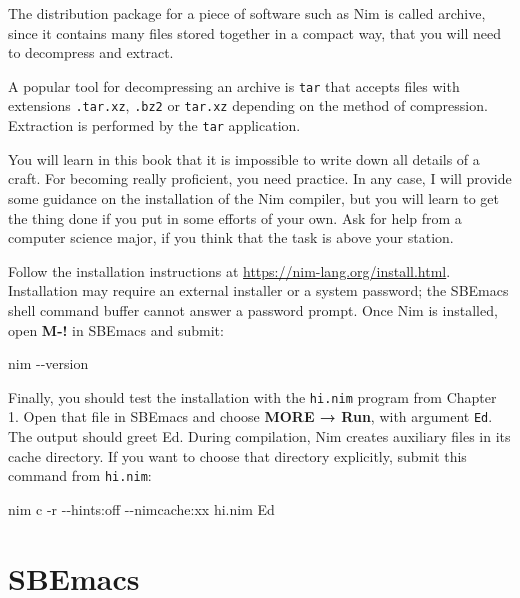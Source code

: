 \documentclass[
  12pt,
]{book}
\newenvironment{Shaded}{}{}
\newcommand{\AttributeTok}[1]{\textcolor[rgb]{0.49,0.56,0.16}{#1}}
\newcommand{\ExtensionTok}[1]{#1}
\newcommand{\NormalTok}[1]{#1}
\begin{document}
The distribution package for a piece of software such as Nim is called
archive, since it contains many files stored together in a compact way,
that you will need to decompress and extract.

A popular tool for decompressing an archive is \texttt{tar} that accepts
files with extensions \texttt{.tar.xz}, \texttt{.bz2} or \texttt{tar.xz}
depending on the method of compression. Extraction is performed by the
\texttt{tar} application.

You will learn in this book that it is impossible to write down all
details of a craft. For becoming really proficient, you need practice.
In any case, I will provide some guidance on the installation of the Nim
compiler, but you will learn to get the thing done if you put in some
efforts of your own. Ask for help from a computer science major, if you
think that the task is above your station.

Follow the installation instructions at
\url{https://nim-lang.org/install.html}. Installation may require an
external installer or a system password; the SBEmacs shell command
buffer cannot answer a password prompt. Once Nim is installed, open
\textbf{M-!} in SBEmacs and submit:

\begin{Shaded}
\begin{Highlighting}[]
\ExtensionTok{nim} \AttributeTok{{-}{-}version}
\end{Highlighting}
\end{Shaded}

Finally, you should test the installation with the \texttt{hi.nim}
program from Chapter 1. Open that file in SBEmacs and choose
\textbf{MORE → Run}, with argument \texttt{Ed}. The output should greet
Ed. During compilation, Nim creates auxiliary files in its cache
directory. If you want to choose that directory explicitly, submit this
command from \texttt{hi.nim}:

\begin{Shaded}
\begin{Highlighting}[]
\ExtensionTok{nim}\NormalTok{ c }\AttributeTok{{-}r} \AttributeTok{{-}{-}hints:off} \AttributeTok{{-}{-}nimcache:xx}\NormalTok{ hi.nim Ed}
\end{Highlighting}
\end{Shaded}

\chapter{SBEmacs}\label{sbemacs}
\end{document}
